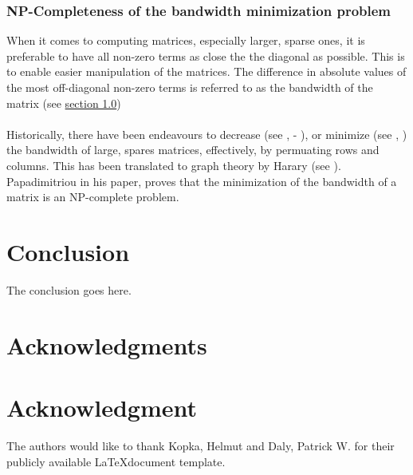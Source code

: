 \documentclass[conference,compsoc]{IEEEtran}
\begin{document}
\subsubsection{NP-Completeness of the bandwidth minimization problem}
When it comes to computing matrices, especially larger, sparse ones, it is preferable to have all non-zero terms as close the the diagonal as possible. This is to enable easier manipulation of the matrices. The difference in absolute values of the most off-diagonal non-zero terms is referred to as the bandwidth of the matrix (see \hyperref[intro]{section 1.0})
\\
\\
Historically, there have been endeavours to decrease (see \cite{10.1145/800195.805928}, - \cite{sparse}), or minimize (see \cite{chen}, \cite{chen2}) the bandwidth of large, spares matrices, effectively, by permuating rows and columns. This has been translated to graph theory by Harary (see \cite{1973141}). 
Papadimitriou in his paper, proves that the minimization of the bandwidth of a matrix is an NP-complete problem. \cite{papadimitriou_1976}


\section{Conclusion}
The conclusion goes here.



\ifCLASSOPTIONcompsoc
  \section*{Acknowledgments}
\else
  \section*{Acknowledgment}
\fi


The authors would like to thank Kopka, Helmut and Daly, Patrick W. \cite{10.5555/940746} for their publicly available \LaTeX document template.







\end{document}
